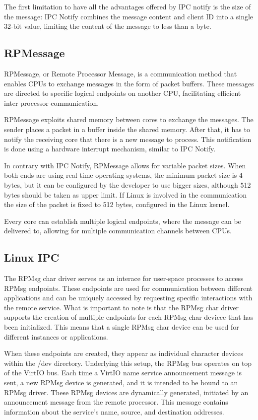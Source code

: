 The first limitation to have all the advantages offered by IPC notify is the
size of the message: IPC Notify combines the message content and client ID into
a single 32-bit value, limiting the content of the message to less than a byte.

\subsection{RPMessage}

RPMessage, or Remote Processor Message, is a communication method that enables
CPUs to exchange messages in the form of packet buffers. These messages are
directed to specific logical endpoints on another CPU, facilitating efficient
inter-processor communication.

RPMessage exploits shared memory between cores to exchange the messages.
The sender places a packet in a buffer inside the shared memory. After that,
it has to notify the receiving core that there is a new message to process.
This notification is done using a hardware interrupt mechanism, similar to
IPC Notify.

In contrary with IPC Notify, RPMessage allows for variable packet sizes.
When both ends are using real-time operating systems, the minimum packet size
is 4 bytes, but it can be configured by the developer to use bigger sizes,
although 512 bytes should be taken as upper limit.
If Linux is involved in the communication the size of the packet is fixed to
512 bytes, configured in the Linux kernel.

Every core can establish multiple logical endpoints, where the message can be
delivered to, allowing for multiple communication channels between CPUs.

\subsection{Linux IPC}

The RPMsg char driver serves as an interace for user-space processes to
access RPMsg endpoints. These endpoints are used for communication between
different applications and can be uniquely accessed by requesting specific
interactions with the remote service. What is important to note is that the
RPMsg char driver supports the creation of multiple endpoints for each RPMsg
char devicce that has been initialized. This means that a single RPMsg char
device can be used for different instances or applications.

When these endpoints are created, they appear as individual character devices
within the /dev directory. Underlying this setup, the RPMsg bus operates on top
of the VirtIO bus. Each time a VirtIO name service announcement message is
sent, a new RPMsg device is generated, and it is intended to be bound to an
RPMsg driver. These RPMsg devices are dynamically generated, initiated by an
announcement message from the remote processor. This message contains
information about the service's name, source, and destination addresses.

